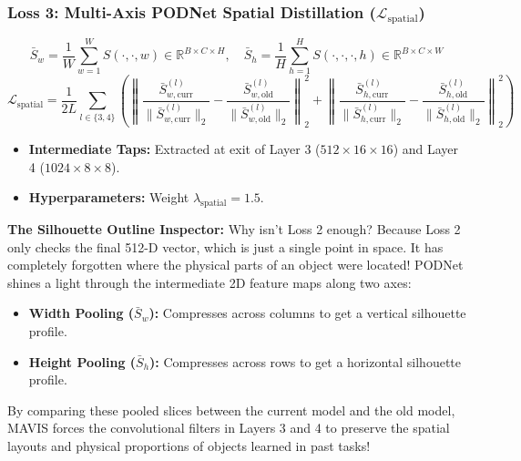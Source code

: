 \documentclass[11pt,a4paper]{article}
\begin{document}
\subsubsection{Loss 3: Multi-Axis PODNet Spatial Distillation ($\mathcal{L}_{\text{spatial}}$)}
\begin{equation}
\bar{S}_w = \frac{1}{W} \sum_{w=1}^W S(\cdot, \cdot, w) \in \mathbb{R}^{B \times C \times H}, \quad \bar{S}_h = \frac{1}{H} \sum_{h=1}^H S(\cdot, \cdot, \cdot, h) \in \mathbb{R}^{B \times C \times W}
\end{equation}
\begin{equation}
\mathcal{L}_{\text{spatial}} = \frac{1}{2 L} \sum_{l \in \{3, 4\}} \left( \left\| \frac{\bar{S}_{w, \text{curr}}^{(l)}}{\|\bar{S}_{w, \text{curr}}^{(l)}\|_2} - \frac{\bar{S}_{w, \text{old}}^{(l)}}{\|\bar{S}_{w, \text{old}}^{(l)}\|_2} \right\|_2^2 + \left\| \frac{\bar{S}_{h, \text{curr}}^{(l)}}{\|\bar{S}_{h, \text{curr}}^{(l)}\|_2} - \frac{\bar{S}_{h, \text{old}}^{(l)}}{\|\bar{S}_{h, \text{old}}^{(l)}\|_2} \right\|_2^2 \right)
\end{equation}
\begin{itemize}[noitemsep]
    \item \textbf{Intermediate Taps:} Extracted at exit of Layer 3 ($512 \times 16 \times 16$) and Layer 4 ($1024 \times 8 \times 8$).
    \item \textbf{Hyperparameters:} Weight $\lambda_{\text{spatial}} = 1.5$.
\end{itemize}

\begin{callout}
\textbf{The Silhouette Outline Inspector:}\newline
Why isn't Loss 2 enough? Because Loss 2 only checks the final 512-D vector, which is just a single point in space. It has completely forgotten where the physical parts of an object were located!\newline
PODNet shines a light through the intermediate 2D feature maps along two axes:
\begin{itemize}[noitemsep]
    \item \textbf{Width Pooling ($\bar{S}_w$):} Compresses across columns to get a vertical silhouette profile.
    \item \textbf{Height Pooling ($\bar{S}_h$):} Compresses across rows to get a horizontal silhouette profile.
\end{itemize}
By comparing these pooled slices between the current model and the old model, MAVIS forces the convolutional filters in Layers 3 and 4 to preserve the spatial layouts and physical proportions of objects learned in past tasks!
\end{callout}
\end{document}
